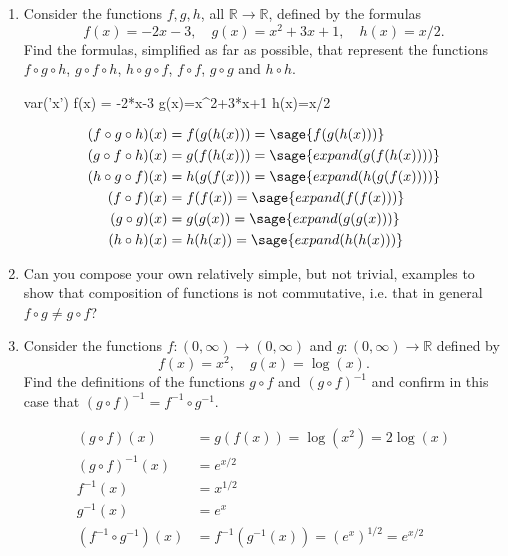 \documentclass[oneside,10pt]{memoir}
\newcounter{pass}
\begin{document}
\begin{enumerate}
\setcounter{enumi}{\value{pass}}
\item
Consider the functions $f,g,h$, all $\mathbb{R} \to \mathbb{R}$, defined by the formulas
$$f(x) = -2x -3, \quad g(x) = x^2 + 3x + 1, \quad h(x) = x/2.$$
Find the formulas, simplified as far as possible, that represent the functions
$f \circ g \circ h$, $g \circ f \circ h$, $h \circ g \circ f$, $f \circ f$, $g \circ g$ and $h \circ h$.
\begin{sagesilent}
var('x')
f(x) = -2*x-3
g(x)=x^2+3*x+1
h(x)=x/2
\end{sagesilent}
\begin{solution}
\begin{align*}
(f \circ g \circ h)(x) &= f(g(h(x))) = \sage{f(g(h(x)))}\\
(g \circ f \circ h)(x) &= g(f(h(x))) = \sage{expand(g(f(h(x))))}\\
(h \circ g \circ f)(x) &= h(g(f(x))) = \sage{expand(h(g(f(x))))}\\
(f \circ f)(x) &= f(f(x)) = \sage{expand(f(f(x)))}\\
(g \circ g)(x) &= g(g(x)) = \sage{expand(g(g(x)))}\\
(h \circ h)(x) &= h(h(x)) = \sage{expand(h(h(x)))}\\
\end{align*}
\end{solution}
\item
Can you compose your own relatively simple, but not trivial, examples to show that composition of functions is not commutative, i.e. that in general $f \circ g \neq g \circ f$?
\item
Consider the functions $f: (0,\infty) \to (0, \infty)$ and $g : (0,\infty) \to \mathbb{R}$ defined by
$$f(x) = x^2, \quad g(x) = \log(x).$$
Find the definitions of the functions $g \circ f$ and $(g \circ f)^{-1}$ and confirm in this case that $(g \circ f)^{-1} = f^{-1} \circ g^{-1}$.
\begin{solution}
\begin{align*}
(g \circ f)(x) &= g(f(x)) = \log \left (x^2 \right ) = 2 \log(x)\\
(g \circ f)^{-1}(x) &= e^{x/2} \\
f^{-1}(x) &= x^{1/2}\\
g^{-1}(x) &= e^x\\
(f^{-1} \circ g^{-1})(x) &= f^{-1}(g^{-1}(x)) = \left ( e^x \right )^{1/2} = e^{x/2}
\end{align*}
\end{solution}
\setcounter{pass}{\value{enumi}}
\end{enumerate}
\end{document}
